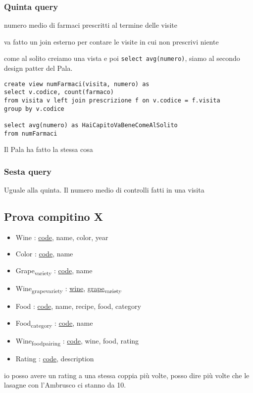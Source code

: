 \documentclass[11pt]{article}
\begin{document}
\subsubsection{Quinta query}
\label{sec:org088b27d}
numero medio di farmaci prescritti al termine delle visite

va fatto un join esterno per contare le visite in cui non prescrivi niente

come al solito creiamo una vista e poi \texttt{select avg(numero)}, siamo al secondo design
patter del Pala.
\begin{verbatim}
create view numFarmaci(visita, numero) as
select v.codice, count(farmaco)
from visita v left join prescrizione f on v.codice = f.visita
group by v.codice

select avg(numero) as HaiCapitoVaBeneComeAlSolito
from numFarmaci
\end{verbatim}

Il Pala ha fatto la stessa cosa

\subsubsection{Sesta query}
\label{sec:org47a1901}
Uguale alla quinta. Il numero medio di controlli fatti in una visita

\subsection{Prova compitino X}
\label{sec:org768b289}
\begin{itemize}
\item Wine : \uline{code}, name, color, year
\item Color : \uline{code}, name
\item Grape\textsubscript{variety} : \uline{code}, name
\item Wine\textsubscript{grape}\textsubscript{variety} : \uline{wine}, \uline{grape\textsubscript{variety}}
\item Food : \uline{code}, name, recipe, food, category
\item Food\textsubscript{category} : \uline{code}, name
\item Wine\textsubscript{food}\textsubscript{pairing} : \uline{code}, wine, food, rating
\item Rating : \uline{code}, description
\end{itemize}

io posso avere un rating a una stessa coppia più volte, posso dire più volte che le
lasagne con l'Ambrusco ci stanno da 10.
\end{document}
